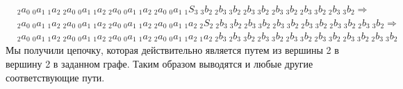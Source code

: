 \begin{example}
\begin{align*}
    	& {_2a_0}\ {_0a_1}\ {_1a_2}\ {_2a_0}\ {_0a_1}\ {_1a_2}\ {_2a_0}\ {_0a_1}\ {_1a_2}\ {_2a_0}\ {_0a_1}\ {_1S_3}\ {_3b_2}\ {_2b_3}\ {_3b_2}\ {_2b_3}\ {_3b_2}\ {_2b_3}\ {_3b_2}\ {_2b_3}\ {_3b_2}\ {_2b_3}\ {_3b_2} \Rightarrow \\
    	& {_2a_0}\ {_0a_1}\ {_1a_2}\ {_2a_0}\ {_0a_1}\ {_1a_2}\ {_2a_0}\ {_0a_1}\ {_1a_2}\ {_2a_0}\ {_0a_1}\ {_1a_2}\ {_2S_2}\ {_2b_3}\ {_3b_2}\ {_2b_3}\ {_3b_2}\ {_2b_3}\ {_3b_2}\ {_2b_3}\ {_3b_2}\ {_2b_3}\ {_3b_2}\ {_2b_3}\ {_3b_2} \Rightarrow \\
    	& {_2a_0}\ {_0a_1}\ {_1a_2}\ {_2a_0}\ {_0a_1}\ {_1a_2}\ {_2a_0}\ {_0a_1}\ {_1a_2}\ {_2a_0}\ {_0a_1}\ {_1a_2}\ {_1a_2}\ {_2b_3}\ {_2b_3}\ {_3b_2}\ {_2b_3}\ {_3b_2}\ {_2b_3}\ {_3b_2}\ {_2b_3}\ {_3b_2}\ {_2b_3}\ {_3b_2}\ {_2b_3}\ {_3b_2}
    \end{align*} 
    Мы получили цепочку, которая действительно является путем из вершины 2 в вершину 2 в заданном графе. Таким образом выводятся и любые другие соответствующие пути.
    
\end{example}


